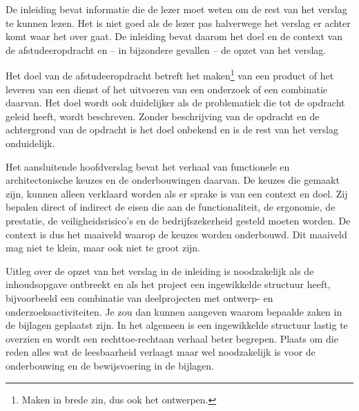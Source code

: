 
De inleiding bevat informatie die de lezer moet weten om de rest van
het verslag te kunnen lezen. Het is niet goed als de lezer pas
halverwege het verslag er achter komt waar het over gaat. De inleiding
bevat daarom het doel en de context van de afstudeeropdracht en -- in
bijzondere gevallen -- de opzet van het verslag.


Het doel van de afstudeeropdracht betreft het maken\footnote{Maken in
brede zin, dus ook het ontwerpen.} van een product of het leveren van
een dienst of het uitvoeren van een onderzoek of een combinatie
daarvan. Het doel wordt ook duidelijker als de problematiek die tot de
opdracht geleid heeft, wordt beschreven. Zonder beschrijving van de
opdracht en de achtergrond van de opdracht is het doel onbekend en is
de rest van het verslag onduidelijk.


Het aansluitende hoofdverslag bevat het verhaal van functionele en
architectonische keuzes en de onderbouwingen daarvan. De keuzes die
gemaakt zijn, kunnen alleen verklaard worden als er sprake is van een
context en doel. Zij bepalen direct of indirect de eisen die aan de
functionaliteit, de ergonomie, de prestatie, de veiligheidsrisico's en
de bedrijfszekerheid gesteld moeten worden.  De context is dus het
maaiveld waarop de keuzes worden onderbouwd. Dit maaiveld mag niet te
klein, maar ook niet te groot zijn.


Uitleg over de opzet van het verslag in de inleiding is noodzakelijk
als de inhoudsopgave ontbreekt en als het project een ingewikkelde
structuur heeft, bijvoorbeeld een combinatie van deelprojecten met
ontwerp- en onderzoeksactiviteiten. Je zou dan kunnen aangeven waarom
bepaalde zaken in de bijlagen geplaatst zijn. In het algemeen is een
ingewikkelde structuur lastig te overzien en wordt een
rechttoe-rechtaan verhaal beter begrepen. Plaats om die reden alles
wat de leesbaarheid verlaagt maar wel noodzakelijk is voor de
onderbouwing en de bewijsvoering in de bijlagen.

